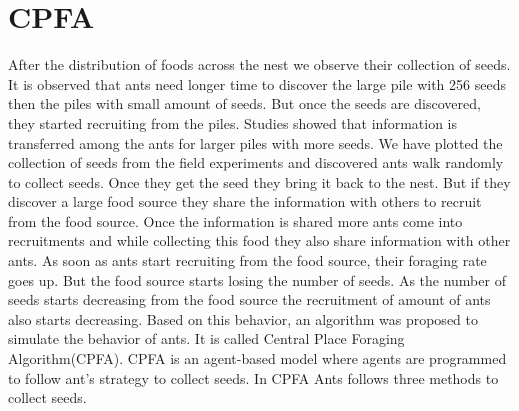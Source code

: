 \section{\label{section:CPFA}CPFA}
After the distribution of foods across the nest we observe their collection of seeds. It is observed that ants need longer time to discover the large pile with 256 seeds then the piles with small amount of seeds. But once the seeds are discovered, they started recruiting from the piles. Studies showed that information is transferred among the ants for larger piles with more seeds. We have plotted the collection of seeds from the field experiments and discovered ants walk randomly to collect seeds. Once they get the seed they bring it back to the nest. But if they discover a large food source they share the information with others to recruit from the food source. Once the information is shared more ants come into recruitments and while collecting this food they also share information with other ants. As soon as ants start recruiting from the food source, their foraging rate goes up. But the food source starts losing the number of seeds. As the number of seeds starts decreasing from the food source the recruitment of amount of ants also starts decreasing. Based on this behavior, an algorithm was proposed to simulate the behavior of ants. It is called Central Place Foraging Algorithm(CPFA). CPFA is an agent-based model where agents are programmed to follow ant’s strategy to collect seeds. In CPFA Ants follows three methods to collect seeds. 
